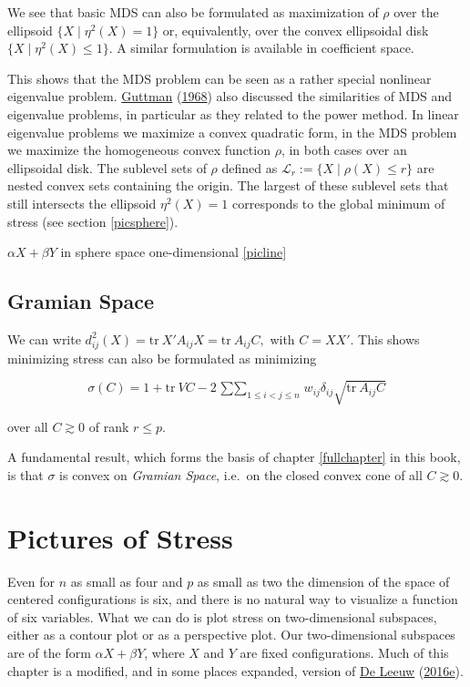 \documentclass[
  12pt,
]{book}
\theoremstyle{definition}
\theoremstyle{definition}
\theoremstyle{definition}
\theoremstyle{definition}
\theoremstyle{remark}
\begin{document}
We see that basic MDS can also be formulated as maximization of \(\rho\) over the ellipsoid \(\{X\mid \eta^2(X)=1\}\) or, equivalently, over the convex ellipsoidal disk \(\{X\mid \eta^2(X)\leq 1\}\). A similar formulation is available in coefficient space.

This shows that the MDS problem can be seen as a rather special nonlinear eigenvalue problem. \protect\hyperlink{ref-guttman_68}{Guttman} (\protect\hyperlink{ref-guttman_68}{1968}) also discussed the similarities of MDS and eigenvalue problems, in particular as they related to the power method. In linear eigenvalue problems we maximize a convex quadratic form, in the MDS problem we maximize the homogeneous convex function \(\rho\), in both cases over an ellipsoidal disk. The sublevel sets of \(\rho\) defined as \(\mathcal{L}_r:=\{X\mid \rho(X)\leq r\}\) are nested convex sets containing the origin. The largest of these sublevel sets that still intersects the ellipsoid \(\eta^2(X)=1\) corresponds to the global minimum of stress (see section \ref{picsphere}).

\(\alpha X+\beta Y\) in sphere space one-dimensional \ref{picline}

\hypertarget{gramian-space}{%
\section{Gramian Space}\label{gramian-space}}

We can write \(d_{ij}^2(X)=\text{tr}\ X'A_{ij}X = \text{tr}\ A_{ij}C,\)
with \(C=XX'\). This shows minimizing stress can also be formulated as minimizing

\begin{equation}
\sigma(C)=1+\text{tr}\ VC-2\mathop{\sum\sum}_{1\leq i<j\leq n}w_{ij}\delta_{ij}\sqrt{\text{tr}\ A_{ij}C}
\label{eq:stresspsd}
\end{equation}

over all \(C\gtrsim 0\) of rank \(r\leq p\).

A fundamental result, which forms the basis of chapter \ref{fullchapter} in this book, is that \(\sigma\) is convex on \emph{Gramian Space}, i.e.~on the closed convex cone of all \(C\gtrsim 0\).

\hypertarget{picsstress}{%
\chapter{Pictures of Stress}\label{picsstress}}

Even for \(n\) as small as four and \(p\) as small as two the dimension of
the space of centered configurations is six, and there is no natural way
to visualize a function of six variables. What we can do is plot stress
on two-dimensional subspaces, either as a contour plot or as a perspective plot. Our two-dimensional subspaces are of the form \(\alpha X+\beta Y\), where \(X\) and \(Y\) are fixed configurations. Much of
this chapter is a modified, and in some places expanded, version of \protect\hyperlink{ref-deleeuw_E_16l}{De Leeuw} (\protect\hyperlink{ref-deleeuw_E_16l}{2016e}).
\end{document}
